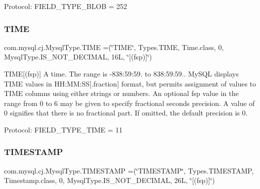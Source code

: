 Protocol\+: F\+I\+E\+L\+D\+\_\+\+T\+Y\+P\+E\+\_\+\+B\+L\+OB = 252 \mbox{\label{enumcom_1_1mysql_1_1cj_1_1_mysql_type_a4f40234bb514d5564a25a6585bd8ab36}} 
\subsubsection{\texorpdfstring{T\+I\+ME}{TIME}}
{\footnotesize\ttfamily com.\+mysql.\+cj.\+Mysql\+Type.\+T\+I\+ME =(\char`\"{}T\+I\+ME\char`\"{}, Types.\+T\+I\+ME, Time.\+class, 0, Mysql\+Type.\+I\+S\+\_\+\+N\+O\+T\+\_\+\+D\+E\+C\+I\+M\+AL, 16\+L, \char`\"{}\mbox{[}(fsp)\mbox{]}\char`\"{})}

T\+I\+ME\mbox{[}(fsp)\mbox{]} A time. The range is \textquotesingle{}-\/838\+:59\+:59.\textquotesingle{} to \textquotesingle{}838\+:59\+:59.\textquotesingle{}. My\+S\+QL displays T\+I\+ME values in \textquotesingle{}H\+H\+:\+MM\+:SS\mbox{[}.fraction\mbox{]}\textquotesingle{} format, but permits assignment of values to T\+I\+ME columns using either strings or numbers. An optional fsp value in the range from 0 to 6 may be given to specify fractional seconds precision. A value of 0 signifies that there is no fractional part. If omitted, the default precision is 0.

Protocol\+: F\+I\+E\+L\+D\+\_\+\+T\+Y\+P\+E\+\_\+\+T\+I\+ME = 11 \mbox{\label{enumcom_1_1mysql_1_1cj_1_1_mysql_type_a8d26bb8a1cf3f337d3294ff11f50c5ae}} 
\subsubsection{\texorpdfstring{T\+I\+M\+E\+S\+T\+A\+MP}{TIMESTAMP}}
{\footnotesize\ttfamily com.\+mysql.\+cj.\+Mysql\+Type.\+T\+I\+M\+E\+S\+T\+A\+MP =(\char`\"{}T\+I\+M\+E\+S\+T\+A\+MP\char`\"{}, Types.\+T\+I\+M\+E\+S\+T\+A\+MP, Timestamp.\+class, 0, Mysql\+Type.\+I\+S\+\_\+\+N\+O\+T\+\_\+\+D\+E\+C\+I\+M\+AL, 26\+L, \char`\"{}\mbox{[}(fsp)\mbox{]}\char`\"{})}

